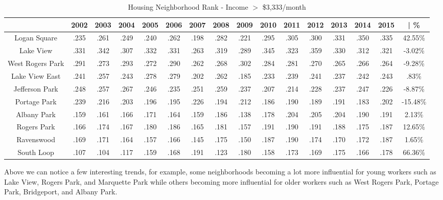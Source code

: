 \documentclass{article}
\theoremstyle{definition}
\theoremstyle{remark}
\begin{document}
\begin{table}[h]\centering
\caption{Housing Neighborhood Rank - Income $>$ \$3,333/month}\label{thelabel}
\begin{adjustbox}{center}
\begin{tabular}{||c | c c c c c c c c c c c c c c | c ||} 
 \hline
 & 2002 & 2003 & 2004 & 2005 & 2006 & 2007 & 2008 & 2009 & 2010 & 2011 & 2012 & 2013 & 2014 & 2015 & | \%\\[0.5ex] 
 \hline\hline
Logan Square & .235 & .261 & .249 & .240 & .262 & .198 & .282 & .221 & .295 & .305 & .300 & .331 & .350 & .335 & 42.55\% \\
Lake View & .331 & .342 & .307 & .332 & .331 & .263 & .319 & .289 & .345 & .323 & .359 & .330 & .312 & .321 & -3.02\% \\
West Rogers Park & .291 & .273 & .293 & .272 & .290 & .262 & .268 & .302 & .284 & .281 & .270 & .265 & .266 & .264 & -9.28\% \\
Lake View East & .241 & .257 & .243 & .278 & .279 & .202 & .262 & .185 & .233 & .239 & .241 & .237 & .242 & .243 & .83\% \\
Jefferson Park & .248 & .257 & .267 & .246 & .235 & .251 & .259 & .237 & .207 & .214 & .228 & .237 & .247 & .226 & -8.87\% \\
Portage Park & .239 & .216 & .203 & .196 & .195 & .226 & .194 & .212 & .186 & .190 & .189 & .191 & .183 & .202 & -15.48\% \\
Albany Park & .159 & .161 & .166 & .171 & .164 & .159 & .186 & .138 & .178 & .204 & .205 & .204 & .190 & .191 & 2.13\% \\
Rogers Park & .166 & .174 & .167 & .180 & .186 & .165 & .181 & .157 & .191 & .190 & .191 & .188 & .175 & .187 & 12.65\% \\
Ravenswood & .169 & .171 & .164 & .157 & .166 & .145 & .175 & .150 & .187 & .190 & .174 & .170 & .172 & .187 & 1.65\% \\
South Loop & .107 & .104 & .117 & .159 & .168 & .191 & .123 & .180 & .158 & .173 & .169 & .175 & .166 & .178 & 66.36\% \\ \hline
 \end{tabular}
\end{adjustbox}
\end{table}

Above we can notice a few interesting trends, for example, some neighborhoods becoming a lot more influential for young workers such as Lake View, Rogers Park, and Marquette Park while others becoming more influential for older workers such as West Rogers Park, Portage Park, Bridgeport, and Albany Park. \\
\end{document}
